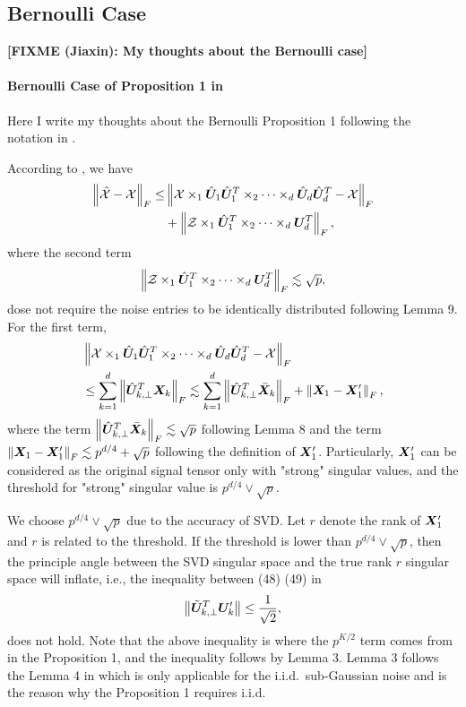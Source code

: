 \documentclass[lettersize,journal]{IEEEtran}
\theoremstyle{definition}
\theoremstyle{definition}
\def\fixme#1#2{\textbf{\color{red}[FIXME (#1): #2]}}
\begin{document}
{
\color{red}

\subsection{Bernoulli Case}

\fixme{Jiaxin}{My thoughts about the Bernoulli case}
\paragraph{Bernoulli Case of Proposition 1 in \cite{han2020exact}} Here I write my thoughts about the Bernoulli Proposition 1 following the notation in \cite{han2020exact}. 

According to \cite{han2020exact}, we have 
\begin{align}
    \left\lVert\hat {\mathcal{X}} - \mathcal{X}\right\rVert_F \leq &\left\lVert \mathcal{X} \times_1 \hat {\bm{U}}_1  \hat {\bm{U}}_1^T \times_2 \cdots \times_d  \hat {\bm{U}}_d  \hat {\bm{U}}_d^T - \mathcal{X}\right\rVert_F \\
    &+ \left\lVert\mathcal{Z} \times_1 \hat {\bm{U}}_1^T \times_2 \cdots \times_d \bm{U}_d^T\right\rVert_F, 
\end{align}
where the second term 
\begin{equation}
    \left\lVert\mathcal{Z} \times_1 \hat {\bm{U}}_1^T \times_2 \cdots \times_d \bm{U}_d^T\right\rVert_F \lesssim \sqrt{p},
\end{equation}
dose not require the noise entries to be identically distributed following Lemma 9. For the first term, 
\begin{align}
    &\left\lVert \mathcal{X} \times_1 \hat {\bm{U}}_1  \hat {\bm{U}}_1^T \times_2 \cdots \times_d  \hat {\bm{U}}_d  \hat {\bm{U}}_d^T - \mathcal{X}\right\rVert_F \\
    &\leq  \sum_{k=1}^d \left\lVert\hat {\bm{U}}^T_{k, \perp} \bm X_k\right\rVert_F 
     \lesssim   \sum_{k=1}^d  \left\lVert\hat {\bm{U}}_{k,\perp}^{T}  \bar {\bm X}_k\right\rVert_F + \left\lVert\bm X_1 - \bm X_1'\right\rVert_F,
\end{align}
where the term $\left\lVert\hat {\bm{U}}_{k,\perp}^{T}  \bar {\bm X}_k\right\rVert_F \lesssim \sqrt{p}$ following Lemma 8 and the term $\left\lVert\bm X_1 - \bm X_1'\right\rVert_F \lesssim p^{d/4} + \sqrt{p}$ following the definition of $\bm X_1'$. Particularly, $\bm X'_1$ can be considered as the original signal tensor only with "strong" singular values, and the threshold for "strong" singular value is $p^{d/4} \vee \sqrt{p}$. 

We choose $p^{d/4} \vee \sqrt{p}$ due to the accuracy of SVD. Let $r$ denote the rank of $\bm X'_1$ and $r$ is related to the threshold. If the threshold is lower than $p^{d/4} \vee \sqrt{p}$, then the principle angle between the SVD singular space and the true rank $r$ singular space will inflate, i.e., the inequality between (48) (49) in \cite{han2020exact}
\begin{equation}
    \left\lVert \tilde {\bm{U}}_{k, \perp}^T \bm{U}_k' \right\rVert \leq \frac{1}{\sqrt{2}},
\end{equation}
does not hold. Note that the above inequality is where the $p^{K/2}$ term comes from in the Proposition 1, and the inequality follows by Lemma 3. Lemma 3 follows the Lemma 4 in \cite{cai2018rate} which is only applicable for the i.i.d.\ sub-Gaussian noise and is the reason why the Proposition 1 requires i.i.d.

}
\end{document}
